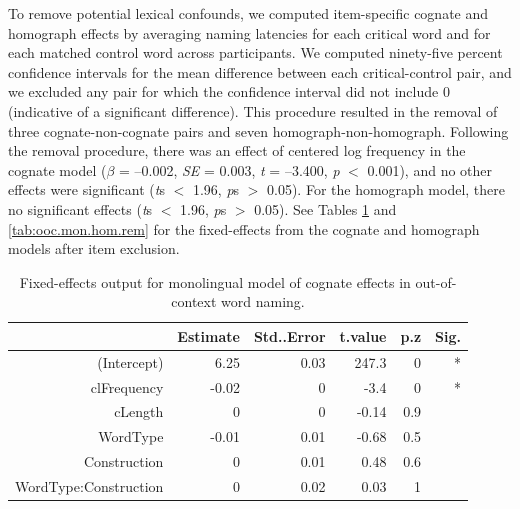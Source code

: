 To remove potential lexical confounds, we computed item-specific cognate and homograph effects by averaging naming latencies for each critical word and for each matched control word across participants. We computed ninety-five percent confidence intervals for the mean difference between each critical-control pair, and we excluded any pair for which the confidence interval did not include 0 (indicative of a significant difference). This procedure resulted in the removal of three cognate-non-cognate pairs and seven homograph-non-homograph. Following the removal procedure, there was an effect of centered log frequency in the cognate model (\emph{$\beta$} = --0.002, \emph{SE} = 0.003, \emph{t} = --3.400, \emph{p} $<$ 0.001), and no other effects were significant (\emph{t}s $<$ 1.96, \emph{p}s $>$ 0.05). For the homograph model, there no significant effects (\emph{t}s $<$ 1.96, \emph{p}s $>$ 0.05). See Tables \ref{tab:ooc.mon.cog.rem} and \ref{tab:ooc.mon.hom.rem} for the fixed-effects from the cognate and homograph models after item exclusion.

\begin{table}[htbp]
  \centering
  \caption{Fixed-effects output for monolingual model of cognate effects in out-of-context word naming.}
    \begin{tabular}{rrrrrr}
    \toprule
          & Estimate & Std..Error & t.value & p.z   & Sig. \\
    \midrule
    (Intercept) & 6.25  & 0.03  & 247.3 & 0     & * \\
    clFrequency & -0.02 & 0     & -3.4  & 0     & * \\
    cLength & 0     & 0     & -0.14 & 0.9   &  \\
    WordType & -0.01 & 0.01  & -0.68 & 0.5   &  \\
    Construction & 0     & 0.01  & 0.48  & 0.6   &  \\
    WordType:Construction & 0     & 0.02  & 0.03  & 1     &  \\
    \bottomrule
    \end{tabular}%
  \label{tab:ooc.mon.cog.rem}%
\end{table}%


